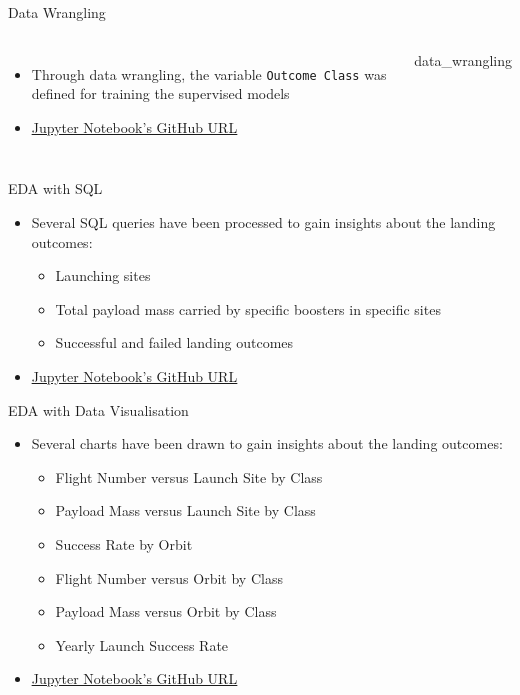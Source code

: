 {\nologo
\begin{frame}{Data Wrangling}
    \begin{columns}
            \begin{itemize}
                \item Through data wrangling, the variable \texttt{Outcome Class} was defined for training the supervised models
                \item \href{https://github.com/eyamrog/ibm_data_science/blob/main/10_Data_Science_Capstone_Lab2_Data_Wrangling.ipynb}{\uline{Jupyter Notebook's GitHub URL}}
            \end{itemize}
            {data_wrangling}
    \end{columns}
\end{frame}
}

\begin{frame}{EDA with SQL}
    \begin{itemize}
        \item Several SQL queries have been processed to gain insights about the landing outcomes:
        \begin{itemize}
            \item Launching sites
            \item Total payload mass carried by specific boosters in specific sites
            \item Successful and failed landing outcomes
        \end{itemize}
        \item \href{https://github.com/eyamrog/ibm_data_science/blob/main/10_Data_Science_Capstone_SQL_Notebook_for_Peer_Assignment.ipynb}{\uline{Jupyter Notebook's GitHub URL}}
    \end{itemize}
\end{frame}

\begin{frame}{EDA with Data Visualisation}
    \begin{itemize}
        \item Several charts have been drawn to gain insights about the landing outcomes:
        \begin{itemize}
            \item Flight Number versus Launch Site by Class
            \item Payload Mass versus Launch Site by Class
            \item Success Rate by Orbit
            \item Flight Number versus Orbit by Class
            \item Payload Mass versus Orbit by Class
            \item Yearly Launch Success Rate
        \end{itemize}
        \item \href{https://github.com/eyamrog/ibm_data_science/blob/main/10_Data_Science_Capstone_EDA_with_Visualisation.ipynb}{\uline{Jupyter Notebook's GitHub URL}}
    \end{itemize}
\end{frame}

